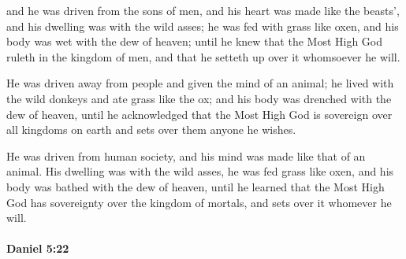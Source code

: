 			\begin{versebox}
					\item[BHS] 
					\item[ASV] and he was driven from the sons of men, and his heart was made like the beasts', and his dwelling was with the wild asses; he was fed with grass like oxen, and his body was wet with the dew of heaven; until he knew that the Most High God ruleth in the kingdom of men, and that he setteth up over it whomsoever he will.
					\item[NIV] He was driven away from people and given the mind of an animal; he lived with the wild donkeys and ate grass like the ox; and his body was drenched with the dew of heaven, until he acknowledged that the Most High God is sovereign over all kingdoms on earth and sets over them anyone he wishes.
					\item[NRSV] He was driven from human society, and his mind was made like that of an animal. His dwelling was with the wild asses, he was fed grass like oxen, and his body was bathed with the dew of heaven, until he learned that the Most High God has sovereignty over the kingdom of mortals, and sets over it whomever he will.
			\end{versebox}

		\paragraph{Daniel 5:22} %
			\label{DANIEL-5-22}


